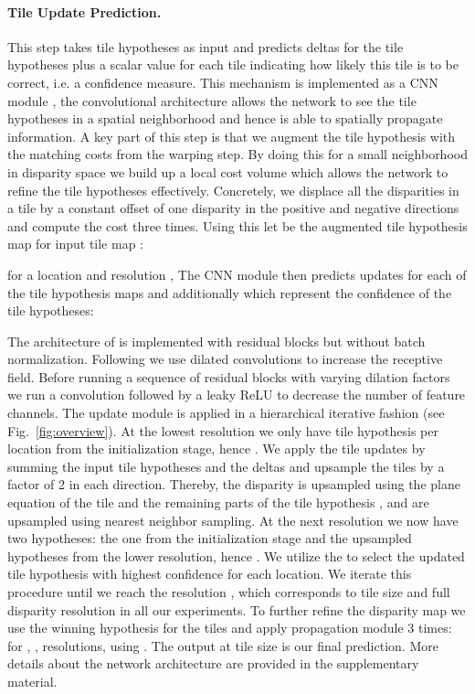 \documentclass[final]{cvpr}
\newcommand{\Figure}[1]{Fig.~\ref{fig:#1}}
\begin{document}
\paragraph{Tile Update Prediction.}
This step takes  tile hypotheses as input and predicts deltas for the tile hypotheses plus a scalar value  for each tile indicating how likely this tile is to be correct, i.e. a confidence measure. This mechanism is implemented as a CNN module , the convolutional architecture allows the network to see the tile hypotheses in a spatial neighborhood and hence is able to spatially propagate information. A key part of this step is that we augment the tile hypothesis with the matching costs  from the warping step. By doing this for a small neighborhood in disparity space we build up a local cost volume which allows the network to refine the tile hypotheses effectively. Concretely, we displace all the disparities in a tile by a constant offset of one disparity  in the positive and negative directions and compute the cost three times. Using this let  be the augmented tile hypothesis map for input tile map :

for a location  and resolution ,  The CNN module  then predicts updates for each of the  tile hypothesis maps and additionally  which represent the confidence of the tile hypotheses:

The architecture of  is implemented with residual blocks \cite{he2016deep} but without batch normalization. Following \cite{stereonet} we use dilated convolutions to increase the receptive field. Before running a sequence of residual blocks with varying dilation factors we run a  convolution followed by a leaky ReLU to decrease the number of feature channels. The update module is applied in a hierarchical iterative fashion (see \Figure{overview}). At the lowest resolution  we only have  tile hypothesis per location from the initialization stage, hence . We apply the tile updates by summing the input tile hypotheses and the deltas and upsample the tiles by a factor of 2 in each direction. Thereby, the disparity  is upsampled using the plane equation of the tile and the remaining parts of the tile hypothesis ,  and  are upsampled using nearest neighbor sampling. At the next resolution  we now have two hypotheses: the one from the initialization stage and the upsampled hypotheses from the lower resolution, hence . We utilize the   to select the updated tile hypothesis with highest confidence for each location. We iterate this procedure until we reach the resolution , which corresponds to tile size  and full disparity resolution in all our experiments. To further refine the disparity map we use the winning hypothesis for the  tiles and apply propagation module 3 times: for , ,   resolutions, using . The output at tile size  is our final prediction. More details about the network architecture are provided in the supplementary material.
\end{document}
